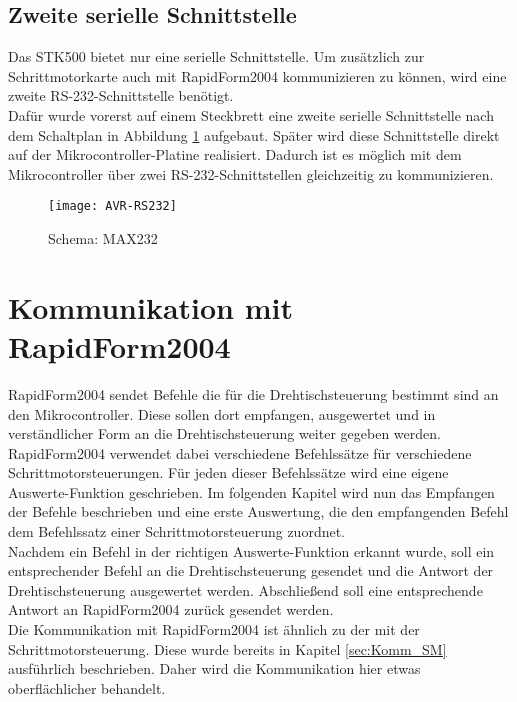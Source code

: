 \subsection{Zweite serielle Schnittstelle}
Das STK500 bietet nur eine serielle Schnittstelle. Um zusätzlich zur Schrittmotorkarte auch mit RapidForm2004 kommunizieren zu können, wird eine zweite RS-232-Schnittstelle benötigt.\\
Dafür wurde vorerst auf einem Steckbrett eine zweite serielle Schnittstelle nach dem Schaltplan in Abbildung \ref{fig:MAX232} aufgebaut. Später wird diese Schnittstelle direkt auf der Mikrocontroller-Platine realisiert.
Dadurch ist es möglich mit dem Mikrocontroller über zwei RS-232-Schnittstellen gleichzeitig zu kommunizieren.
\begin{figure}[h]
\centering
\texttt{[image: AVR-RS232]}
\caption{Schema: MAX232}
\label{fig:MAX232}
\citep{uC:RS232}
\end{figure}

\section{Kommunikation mit RapidForm2004}
\label{sec:Komm_RF2004}
RapidForm2004 sendet Befehle die für die Drehtischsteuerung bestimmt sind an den Mikrocontroller. Diese sollen dort empfangen, ausgewertet und in verständlicher Form an die Drehtischsteuerung weiter gegeben werden. RapidForm2004 verwendet dabei verschiedene Befehlssätze für verschiedene Schrittmotorsteuerungen. Für jeden dieser Befehlssätze wird eine eigene Auswerte-Funktion geschrieben. Im folgenden Kapitel wird nun das Empfangen der Befehle beschrieben und eine erste Auswertung, die den empfangenden Befehl dem Befehlssatz einer Schrittmotorsteuerung zuordnet.\\
Nachdem ein Befehl in der richtigen Auswerte-Funktion erkannt wurde, soll ein entsprechender Befehl an die Drehtischsteuerung gesendet und die Antwort der Drehtischsteuerung ausgewertet werden. Abschließend soll eine entsprechende Antwort an RapidForm2004 zurück gesendet werden.\\
Die Kommunikation mit RapidForm2004 ist ähnlich zu der mit der Schrittmotorsteuerung. Diese wurde bereits in Kapitel \ref{sec:Komm_SM} ausführlich beschrieben. Daher wird die Kommunikation hier etwas oberflächlicher behandelt.
